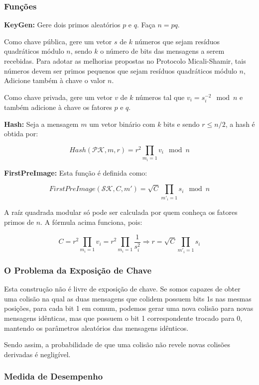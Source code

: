 \documentclass[a4paper]{article}
\begin{document}
\subsubsection{Funções}

\textbf{KeyGen: } Gere dois primos aleatórios $p$ e $q$. Faça $n=pq$.

Como chave pública, gere um vetor $s$ de $k$ números que sejam
resíduos quadráticos módulo $n$, sendo $k$ o número de bits das
mensagens a serem recebidas. Para adotar as melhorias propostas no
Protocolo Micali-Shamir, tais números devem ser primos pequenos que
sejam resíduos quadráticos módulo $n$, Adicione também à chave o valor
$n$.

Como chave privada, gere um vetor $v$ de $k$ números tal que
$v_i=s_i^{-2} \mod n$ e também adicione à chave os fatores $p$ e $q$.

\textbf{Hash: } Seja a mensagem $m$ um vetor binário com $k$ bits e
sendo $r \leq n/2$, a hash é obtida por:

$$ Hash(\mathcal{PK}, m, r) = r^2\prod_{m_i=1}v_i \mod n
$$

\textbf{FirstPreImage: } Esta função é definida como:

$$
FirstPreImage(\mathcal{SK}, C, m') = \sqrt{C}\prod_{m'_i=1}s_i \mod n
$$

A raíz quadrada modular só pode ser calculada por quem conheça os
fatores primos de $n$. A fórmula acima funciona, pois:

$$ C = r^2\prod_{m_i=1}v_i =
r^2\prod_{m_i=1}\frac{1}{s_i^2}\Longrightarrow r=\sqrt{C}\prod_{m'_i=1}s_i
$$

\subsubsection{O Problema da Exposição de Chave}

Esta construção não é livre de exposição de chave. Se somos capazes de
obter uma colisão na qual as duas mensagens que colidem possuem bits
1s nas mesmas posições, para cada bit 1 em comum, podemos gerar uma
nova colisão para novas mensagens idênticas, mas que possuem o bit 1
correspondente trocado para 0, mantendo os parâmetros aleatórios das
mensagens idênticos.

Sendo assim, a probabilidade de que uma colisão não revele novas
colisões derivadas é negligível.

\subsubsection{Medida de Desempenho}
\end{document}
